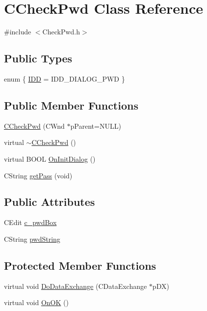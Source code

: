 \hypertarget{classCCheckPwd}{
\section{CCheckPwd Class Reference}
\label{classCCheckPwd}
}


{\ttfamily \#include $<$CheckPwd.h$>$}

\subsection*{Public Types}
\begin{DoxyCompactItemize}
\item 
enum \{ \hyperlink{classCCheckPwd_ab3d9d2f568a32c6fdc6a7f24433c3132aa6ee90c7c0b8a67ddf8989e078e0fe05}{IDD} =  IDD\_\-DIALOG\_\-PWD
 \}
\end{DoxyCompactItemize}
\subsection*{Public Member Functions}
\begin{DoxyCompactItemize}
\item 
\hyperlink{classCCheckPwd_a7055776a08f3151d69ef9f78efa7ce09}{CCheckPwd} (CWnd $\ast$pParent=NULL)
\item 
virtual \hyperlink{classCCheckPwd_ae1c45b8d6721f67444bc4869ebeb5484}{$\sim$CCheckPwd} ()
\item 
virtual BOOL \hyperlink{classCCheckPwd_ae0f2e7d72176a8b9ca759df361362b1d}{OnInitDialog} ()
\item 
CString \hyperlink{classCCheckPwd_aa4954c2f13df6b8fa7abcf37c0e224a8}{getPass} (void)
\end{DoxyCompactItemize}
\subsection*{Public Attributes}
\begin{DoxyCompactItemize}
\item 
CEdit \hyperlink{classCCheckPwd_a65416e66181e60e1c89c8afc3340da11}{c\_\-pwdBox}
\item 
CString \hyperlink{classCCheckPwd_ac2768da28ea7f8153d66f606add42fc2}{pwdString}
\end{DoxyCompactItemize}
\subsection*{Protected Member Functions}
\begin{DoxyCompactItemize}
\item 
virtual void \hyperlink{classCCheckPwd_abe46b2d16fafd5f612f19c9180e50971}{DoDataExchange} (CDataExchange $\ast$pDX)
\item 
virtual void \hyperlink{classCCheckPwd_ae81a6c7af1f44f400d8f1b86b4d12005}{OnOK} ()
\end{DoxyCompactItemize}


